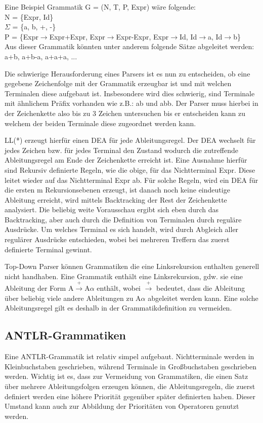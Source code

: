 Eine Beispiel Grammatik G = (N, T, P, Expr) wäre folgende: \\
N = \{Expr, Id\} \\
$\Sigma$ = \{a, b, +, -\} \\
P = \{Expr$\rightarrow$Expr+Expr, Expr$\rightarrow$Expr-Expr, Expr$\rightarrow$Id, Id$\rightarrow$a, Id$\rightarrow$b\} \\

Aus dieser Grammatik könnten unter anderem folgende Sätze abgeleitet werden: a+b, a+b-a, a+a+a, ...

Die schwierige Herausforderung eines Parsers ist es nun zu entscheiden, ob eine gegebene Zeichenfolge mit der Grammatik erzeugbar ist und mit welchen Terminalen diese aufgebaut ist. Insbesondere wird dies schwierig, sind Terminale mit ähnlichem Präfix vorhanden wie z.B.: ab und abb. Der Parser muss hierbei in der Zeichenkette also bis zu 3 Zeichen untersuchen bis er entscheiden kann zu welchem der beiden Terminale diese zugeordnet werden kann.

LL(*) erzeugt hierfür einen \ac{DEA} für jede Ableitungsregel. Der \ac{DEA} wechselt für jedes Zeichen bzw. für jedes Terminal den Zustand wodurch die zutreffende Ableitungsregel am Ende der Zeichenkette erreicht ist. Eine Ausnahme hierfür sind Rekursiv definierte Regeln, wie die obige, für das Nichtterminal Expr. Diese leitet wieder auf das Nichtterminal Expr ab. Für solche Regeln, wird ein \ac{DEA} für die ersten m Rekursionsebenen erzeugt, ist danach noch keine eindeutige Ableitung erreicht, wird mittels Backtracking der Rest der Zeichenkette analysiert.
Die beliebig weite Vorausschau ergibt sich eben durch das Backtracking, aber auch durch die Definition von Terminalen durch reguläre Ausdrücke. Um welches Terminal es sich handelt, wird durch Abgleich aller regulärer Ausdrücke entschieden, wobei bei mehreren Treffern das zuerst definierte Terminal gewinnt. \cite{ll_star_parser}

Top-Down Parser können Grammatiken die eine Linksrekursion enthalten generell nicht handhaben. \cite{compiler_dragon_book} Eine Grammatik enthält eine Linksrekursion, gdw. sie eine Ableitung der Form A$\xrightarrow{\text{+}}$A$\alpha$ enthält, wobei $\xrightarrow{\text{+}}$ bedeutet, dass die Ableitung über beliebig viele andere Ableitungen zu A$\alpha$ abgeleitet werden kann.
Eine solche Ableitungsregel gilt es deshalb in der Grammatikdefinition zu vermeiden.

\subsection{ANTLR-Grammatiken}
Eine ANTLR-Grammatik ist relativ simpel aufgebaut. Nichtterminale werden in Kleinbuchstaben geschrieben, während Terminale in Großbuchstaben geschrieben werden. Wichtig ist es, dass zur Vermeidung von Grammatiken, die einen Satz über mehrere Ableitungsfolgen erzeugen können, die Ableitungsregeln, die zuerst definiert werden eine höhere Priorität gegenüber später definierten haben. \cite{antlr_doc}
Dieser Umstand kann auch zur Abbildung der Prioritäten von Operatoren genutzt werden.

